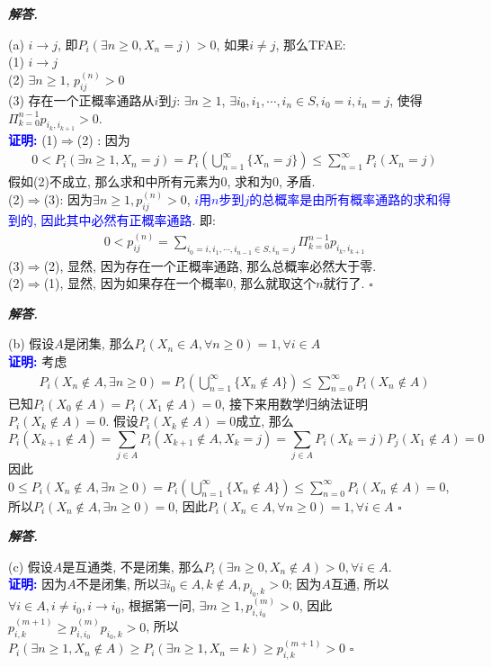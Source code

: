 \documentclass[10pt, a4paper, oneside]{ctexart}
\newenvironment{solution}{%
  \par\noindent\textbf{\textit{解答. }}\ignorespaces
}{%
  \hfill\ensuremath{\square}\par %
}
\begin{document}
\begin{solution}
(a) $i\to j$, 即$P_i(\exists n\geq 0, X_n=j)>0$, 如果$i\neq j$, 那么TFAE:\\
(1) $i\to j$\\
(2) $\exists n\geq 1$, $p_{ij}^{(n)}>0$\\
(3) 存在一个正概率通路从$i$到$j$: $\exists n\geq 1$, $\exists i_0, i_1,\cdots, i_n\in S, i_0=i,i_n=j$, 使得$\Pi_{k=0}^{n-1}p_{i_k, i_{k+1}}>0$.\\
\textcolor{blue}{\textbf{证明:}} (1)$\Rightarrow$(2) : 因为
\begin{align*}
    0<P_i(\exists n\geq 1, X_n=j)=P_i(\bigcup_{n=1}^{\infty}\{X_n=j\} )\leq \sum_{n=1}^{\infty} P_i(X_n=j)
\end{align*}
假如(2)不成立, 那么求和中所有元素为$0$, 求和为$0$, 矛盾.\\
(2)$\Rightarrow$(3): 因为$\exists n\geq 1, p_{ij}^{(n)}>0$, \textcolor{blue}{$i$用$n$步到$j$的总概率是由所有概率通路的求和得到的, 因此其中必然有正概率通路}. 即:
\begin{align*}
    0<p_{ij}^{(n)}=\sum_{i_0=i, i_1,\cdots, i_{n-1}\in S, i_n=j} \Pi_{k=0}^{n-1}p_{i_k,i_{k+1}}
\end{align*}
(3)$\Rightarrow$(2), 显然, 因为存在一个正概率通路, 那么总概率必然大于零. \\
(2)$\Rightarrow$(1), 显然, 因为如果存在一个概率$0$, 那么就取这个$n$就行了.
\end{solution}
\begin{solution}
(b) 假设$A$是闭集, 那么$P_i(X_n\in A,\forall n\geq 0)=1, \forall i\in A$\\
\textcolor{blue}{\textbf{证明:}} 考虑
\begin{align*}
    P_i(X_n\notin A, \exists n\geq 0)=P_i(\bigcup_{n=1}^{\infty}\{X_n\notin A\})\leq \sum_{n=0}^{\infty}P_i(X_n\notin A)
\end{align*}
已知$P_i(X_0\notin A)=P_i(X_1\notin A)=0$, 接下来用数学归纳法证明$P_i(X_k\notin A)=0$. 假设$P_i(X_k\notin A)=0$成立, 那么
$$P_i(X_{k+1}\notin A)=\sum_{j\in A}P_i(X_{k+1}\notin A, X_{k}=j)=\sum_{j\in A}P_{i}(X_k=j)P_j(X_{1}\notin A)=0$$
因此$0\leq P_i(X_n\notin A, \exists n\geq 0)=P_i(\bigcup_{n=1}^{\infty}\{X_n\notin A\})\leq \sum_{n=0}^{\infty}P_i(X_n\notin A)=0$, 所以$P_i(X_n\notin A, \exists n\geq 0)=0$, 因此$P_i(X_n\in A,\forall n\geq 0)=1, \forall i\in A$
\end{solution}
\begin{solution}
(c) 假设$A$是互通类, 不是闭集, 那么$P_i(\exists n\geq 0, X_n\notin A)>0, \forall i\in A$.\\
\textcolor{blue}{\textbf{证明:}} 因为$A$不是闭集, 所以$\exists i_0\in A,k\notin A, p_{i_0,k}>0$; 因为$A$互通, 所以$\forall i\in A, i\neq i_0, i\to i_0$, 根据第一问, $\exists m\geq 1, p_{i,i_0}^{(m)}>0$, 因此$p_{i,k}^{(m+1)}\geq p_{i,i_0}^{(m)}p_{i_0,k}>0$, 所以$P_i(\exists n\geq 1, X_n\notin A)\geq P_i(\exists n\geq 1, X_n=k)\geq p_{i,k}^{(m+1)}>0$
\end{solution}
\end{document}
